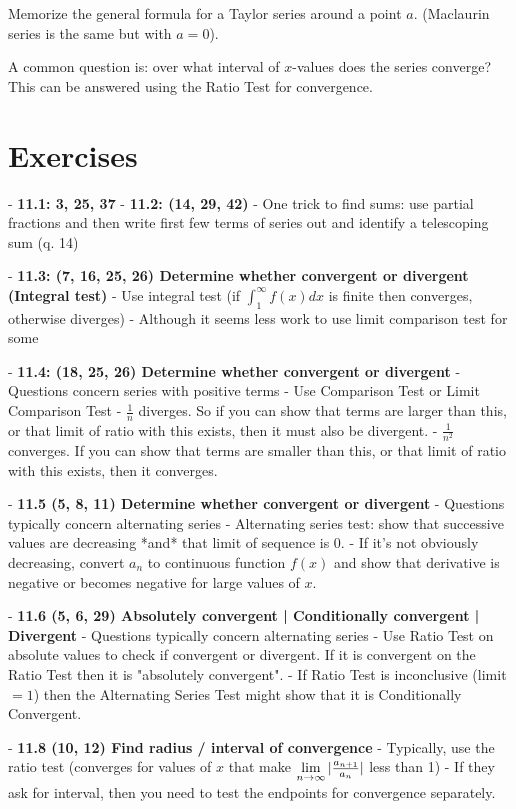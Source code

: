 Memorize the general formula for a Taylor series around a point $a$. (Maclaurin series is the same but with $a=0$).

A common question is: over what interval of $x$-values does the series converge? This can be answered using the Ratio Test for convergence.



\section{Exercises}

- \textbf{11.1: 3, 25, 37}
- \textbf{11.2: (14, 29, 42)}
    - One trick to find sums: use partial fractions and then write first few terms of series out and identify a telescoping sum (q. 14)

- \textbf{11.3: (7, 16, 25, 26) Determine whether convergent or divergent (Integral test)}
    - Use integral test (if $\int_1^\infty f(x) dx$ is finite then converges, otherwise diverges)
    - Although it seems less work to use limit comparison test for some

- \textbf{11.4: (18, 25, 26) Determine whether convergent or divergent}
    - Questions concern series with positive terms
    - Use Comparison Test or Limit Comparison Test
    - $\frac{1}{n}$ diverges. So if you can show that terms are larger than this, or that limit of ratio with this exists, then it must also be divergent.
    - $\frac{1}{n^2}$ converges. If you can show that terms are smaller than this, or that limit of ratio with this exists, then it converges.

- \textbf{11.5 (5, 8, 11) Determine whether convergent or divergent}
    - Questions typically concern alternating series
    - Alternating series test: show that successive values are decreasing *and* that limit of sequence is 0.
    - If it's not obviously decreasing, convert $a_n$ to continuous function $f(x)$ and show that derivative is negative or becomes negative for large values of $x$.

- \textbf{11.6 (5, 6, 29) Absolutely convergent | Conditionally convergent | Divergent}
    - Questions typically concern alternating series
    - Use Ratio Test on absolute values to check if convergent or divergent. If it is convergent on the Ratio Test then it is "absolutely convergent".
    - If Ratio Test is inconclusive (limit $= 1$) then the Alternating Series Test might show that it is Conditionally Convergent.

- \textbf{11.8 (10, 12) Find radius / interval of convergence}
    - Typically, use the ratio test (converges for values of $x$ that make $\lim\limits_{n \to \infty} |\frac{a_{n+1}}{a_n}|$ less than 1)
    - If they ask for interval, then you need to test the endpoints for convergence separately.

